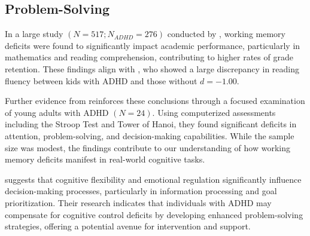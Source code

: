\documentclass[stu]{apa7}
\begin{document}
\subsection{Problem-Solving}


In a large study \((N = 517; N_{ADHD} = 276)\) conducted by \textcite{fried_clinical_2016}, working memory deficits were found to significantly impact academic performance, particularly in mathematics and reading comprehension, contributing to higher rates of grade retention. These findings align with \textcite{friedman_reading_2017}, who showed a large discrepancy in reading fluency between kids with ADHD and those without \(d = -1.00\).

Further evidence from \textcite{capri_attention_2019} reinforces these conclusions through a focused examination of young adults with ADHD \((N = 24)\). Using computerized assessments including the Stroop Test and Tower of Hanoi, they found significant deficits in attention, problem-solving, and decision-making capabilities. While the sample size was modest, the findings contribute to our understanding of how working memory deficits manifest in real-world cognitive tasks.

\textcite{drigas_executive_2019} suggests that cognitive flexibility and emotional regulation significantly influence decision-making processes, particularly in information processing and goal prioritization. Their research indicates that individuals with ADHD may compensate for cognitive control deficits by developing enhanced problem-solving strategies, offering a potential avenue for intervention and support.

\end{document}
